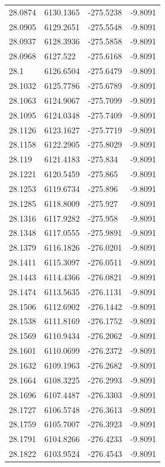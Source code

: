 \begin{table}[H]
\begin{tabular}{llll}
28.0874 & 6130.1365 & -275.5238 & -9.8091 \\
28.0905 & 6129.2651 & -275.5548 & -9.8091 \\
28.0937 & 6128.3936 & -275.5858 & -9.8091 \\
28.0968 & 6127.522 & -275.6168 & -9.8091 \\
28.1 & 6126.6504 & -275.6479 & -9.8091 \\
28.1032 & 6125.7786 & -275.6789 & -9.8091 \\
28.1063 & 6124.9067 & -275.7099 & -9.8091 \\
28.1095 & 6124.0348 & -275.7409 & -9.8091 \\
28.1126 & 6123.1627 & -275.7719 & -9.8091 \\
28.1158 & 6122.2905 & -275.8029 & -9.8091 \\
28.119 & 6121.4183 & -275.834 & -9.8091 \\
28.1221 & 6120.5459 & -275.865 & -9.8091 \\
28.1253 & 6119.6734 & -275.896 & -9.8091 \\
28.1285 & 6118.8009 & -275.927 & -9.8091 \\
28.1316 & 6117.9282 & -275.958 & -9.8091 \\
28.1348 & 6117.0555 & -275.9891 & -9.8091 \\
28.1379 & 6116.1826 & -276.0201 & -9.8091 \\
28.1411 & 6115.3097 & -276.0511 & -9.8091 \\
28.1443 & 6114.4366 & -276.0821 & -9.8091 \\
28.1474 & 6113.5635 & -276.1131 & -9.8091 \\
28.1506 & 6112.6902 & -276.1442 & -9.8091 \\
28.1538 & 6111.8169 & -276.1752 & -9.8091 \\
28.1569 & 6110.9434 & -276.2062 & -9.8091 \\
28.1601 & 6110.0699 & -276.2372 & -9.8091 \\
28.1632 & 6109.1963 & -276.2682 & -9.8091 \\
28.1664 & 6108.3225 & -276.2993 & -9.8091 \\
28.1696 & 6107.4487 & -276.3303 & -9.8091 \\
28.1727 & 6106.5748 & -276.3613 & -9.8091 \\
28.1759 & 6105.7007 & -276.3923 & -9.8091 \\
28.1791 & 6104.8266 & -276.4233 & -9.8091 \\
28.1822 & 6103.9524 & -276.4543 & -9.8091 \\

\end{tabular}
\end{table}
